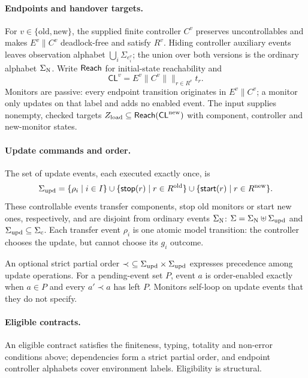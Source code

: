 \paragraph{Endpoints and handover targets.}
\label{def:endpoint_controllers}
For $v\in\{\mathrm{old},\mathrm{new}\}$, the supplied finite controller $C^v$ preserves uncontrollables and makes $E^v\parallel C^v$ deadlock-free and satisfy $R^v$. Hiding controller auxiliary events leaves observation alphabet $\bigcup_i\Sigma_{e_i^v}$; the union over both versions is the ordinary alphabet $\Sigma_{\mathrm{N}}$. Write $\mathsf{Reach}$ for initial-state reachability and
\[
\mathsf{CL}^v=E^v\parallel C^v\parallel\mathop{\parallel}_{r\in R^v}t_r.
\]
Monitors are passive: every endpoint transition originates in $E^v\parallel C^v$; a monitor only updates on that label and adds no enabled event.
The input supplies nonempty, checked targets $Z_{\mathrm{load}}\subseteq\mathsf{Reach}(\mathsf{CL}^{\mathrm{new}})$ with component, controller and new-monitor states.

\paragraph{Update commands and order.}
The set of update events, each executed exactly once, is
  \begin{equation}
  \Sigma_{\mathrm{upd}}=
    \{\rho_i\mid i\in I\}
    \cup\{\mathsf{stop}(r)\mid r\in R^{\mathrm{old}}\}
    \cup\{\mathsf{start}(r)\mid r\in R^{\mathrm{new}}\}.
  \end{equation}
These controllable events transfer components, stop old monitors or start new ones, respectively, and are disjoint from ordinary events $\Sigma_{\mathrm{N}}$:
$\Sigma=\Sigma_{\mathrm{N}}\uplus\Sigma_{\mathrm{upd}}$ and $\Sigma_{\mathrm{upd}}\subseteq\Sigma_{\mathrm{c}}$. Each transfer event $\rho_i$ is one atomic model transition: the controller chooses the update, but cannot choose its $g_i$ outcome.

An optional strict partial order $\prec\ \subseteq\SigmaU\times\SigmaU$ expresses precedence among update operations. For a pending-event set $P$, event $a$ is order-enabled exactly when $a\in P$ and every $a'\prec a$ has left $P$.
Monitors self-loop on update events that they do not specify.
\paragraph{Eligible contracts.}
An eligible contract satisfies the finiteness, typing, totality and non-error conditions above; dependencies form a strict partial order, and endpoint controller alphabets cover environment labels. Eligibility is structural.

